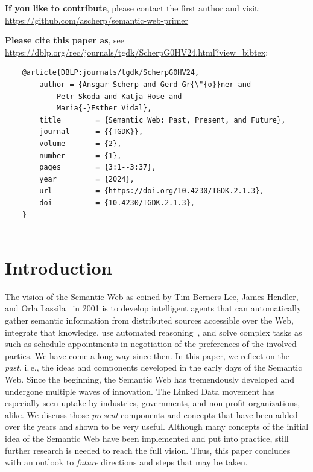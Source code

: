 \documentclass[a4paper,USenglish]{tgdk-v2021}
\begin{document}
\textbf{If you like to contribute}, please contact the first author and visit: \url{https://github.com/ascherp/semantic-web-primer}

\textbf{Please cite this paper as}, see \url{https://dblp.org/rec/journals/tgdk/ScherpG0HV24.html?view=bibtex}:

\begin{verbatim}
	@article{DBLP:journals/tgdk/ScherpG0HV24,
		author = {Ansgar Scherp and Gerd Gr{\"{o}}ner and
			Petr Skoda and Katja Hose and
			Maria{-}Esther Vidal},
		title        = {Semantic Web: Past, Present, and Future},
		journal      = {{TGDK}},
		volume       = {2},
		number       = {1},
		pages        = {3:1--3:37},
		year         = {2024},
		url          = {https://doi.org/10.4230/TGDK.2.1.3},
		doi          = {10.4230/TGDK.2.1.3},
	}
	
\end{verbatim}

\vfill

\clearpage
\tableofcontents
\clearpage


\section{Introduction}

The vision of the Semantic Web as coined by Tim Berners-Lee, James Hendler, and Orla Lassila~\cite{TimBernersLee2001} in 2001 is to develop intelligent agents that can automatically gather semantic information from distributed sources accessible over the Web, integrate that knowledge, use automated reasoning~\cite{DBLP:journals/ki/GlimmS16a}, and solve complex tasks as such as schedule appointments in negotiation of the preferences of the involved parties.
We have come a long way since then.
In this paper, we reflect on the \textit{past}, i.\,e., the ideas and components developed in the early days of the Semantic Web.
Since the beginning, the Semantic Web has tremendously developed and undergone multiple waves of innovation.
The Linked Data movement has especially seen uptake by industries, governments, and non-profit organizations, alike.
We discuss those \textit{present} components and concepts that have been added over the years and shown to be very useful.
Although many concepts of the initial idea of the Semantic Web have been implemented and put into practice, still further research is needed to reach the full vision.
Thus, this paper concludes with an outlook to \textit{future} directions and steps that may be taken.
\end{document}
